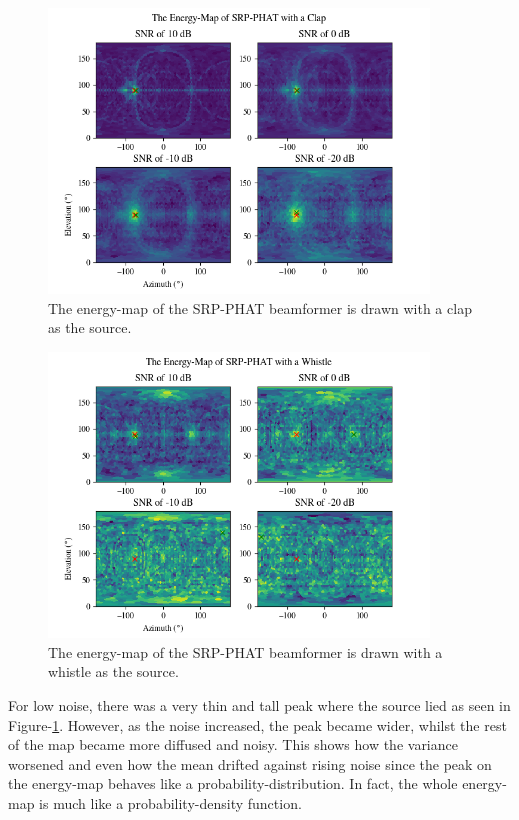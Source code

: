 \documentclass[notitlepage]{report}
\begin{document}
\begin{figure}[H]
\includegraphics[width=0.9\textwidth]{../Python/srp_phat/noise/clap/map.png}
\centering
\caption{The energy-map of the SRP-PHAT beamformer is drawn with a clap as the source.}
\label{fig:srp_phat_noise_map_clap}
\centering
\end{figure}

\begin{figure}[H]
\includegraphics[width=0.9\textwidth]{../Python/srp_phat/noise/whistle/map.png}
\centering
\caption{The energy-map of the SRP-PHAT beamformer is drawn with a whistle as the source.}
\label{fig:srp_phat_noise_map_whistle}
\centering
\end{figure}

For low noise, there was a very thin and tall peak where the source lied as seen in Figure-\ref{fig:srp_phat_noise_map_clap}. However, as the noise increased, the peak became wider, whilst the rest of the map became more diffused and noisy. This shows how the variance worsened and even how the mean drifted against rising noise since the peak on the energy-map behaves like a probability-distribution. In fact, the whole energy-map is much like a probability-density function.
\end{document}
